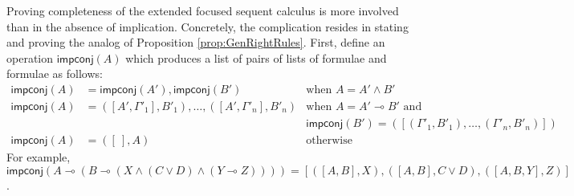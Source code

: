 \documentclass[submission,copyright,creativecommons]{eptcs}
\theoremstyle{definition}
\newcommand{\lolli}{\multimap}
\newcommand{\impconj}[1]{\mathsf{impconj} (#1)}
\newcommand{\proofbox}[1]{\begin{tabular}{l} #1 \end{tabular}}
\newcommand\niccolo[1]{\mbox{}
{\marginpar{\color{red}NV}}
{\sf\noindent\color{red}#1}}%
\begin{document}



Proving completeness of the extended focused sequent calculus is more involved than in the absence of implication. Concretely, the complication resides in stating and proving the analog of Proposition \ref{prop:GenRightRules}. First, define an operation $\mathsf{impconj}(A)$ which produces a list of pairs of lists of formulae and formulae as follows: 
\begin{displaymath}
  \begin{array}{rll}
    \impconj{A} &= \impconj{A'} , \impconj{B'} &\text{when } A = A' \land B'
    \\
    \impconj{A} &= ([A' , \Gamma'_1] , B'_1) , \dots , ([A' , \Gamma'_n] , B'_n) &\text{when } A = A' \lolli B' \text{ and}
    \\
    & &\impconj{B'} = ([(\Gamma'_1 , B'_1) , \dots , (\Gamma'_n , B'_n)])
    \\
    \impconj{A} &= ([\ ] , A) &\text{otherwise}
  \end{array}
\end{displaymath}
For example, $\impconj{A \lolli (B \lolli (X \land (C \lor D) \land (Y \lolli Z)))} = [([A , B] , X) , ([A , B] , C \lor D) , ([A , B , Y] , Z)]$.
\end{document}
